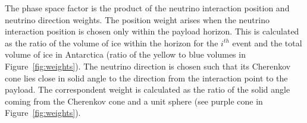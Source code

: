 


The phase space factor is the product of the neutrino interaction
position and neutrino direction weights.
The position weight arises when the neutrino interaction position is
chosen only within the payload horizon.
This is calculated as
the ratio of the volume of ice within the horizon for the $i^{th}$
event and the total volume of ice in Antarctica (ratio of the yellow to blue
volumes in Figure~\ref{fig:weights}).
The neutrino direction is chosen such that its Cherenkov cone
lies close in solid angle to the direction from the interaction point to the payload. 
The correspondent weight is calculated as the ratio of the solid angle coming from the Cherenkov cone and a unit sphere (see purple cone in Figure~\ref{fig:weights}).

